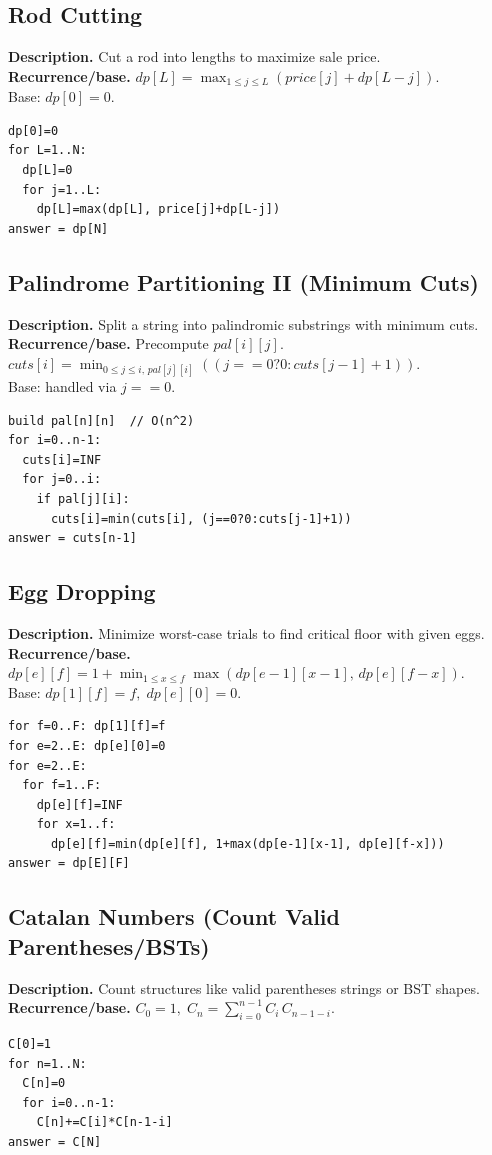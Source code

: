 \documentclass[9pt]{extarticle}
\begin{document}
\subsection{Rod Cutting}
\textbf{Description.} Cut a rod into lengths to maximize sale price.\\
\textbf{Recurrence/base.} \(dp[L]=\max_{1\le j\le L}(price[j]+dp[L-j])\).\\  
Base: \(dp[0]=0\).
\begin{verbatim}
dp[0]=0
for L=1..N:
  dp[L]=0
  for j=1..L:
    dp[L]=max(dp[L], price[j]+dp[L-j])
answer = dp[N]
\end{verbatim}

\subsection{Palindrome Partitioning II (Minimum Cuts)}
\textbf{Description.} Split a string into palindromic substrings with minimum cuts.\\
\textbf{Recurrence/base.} Precompute \(pal[i][j]\).  \\
\(cuts[i]=\min_{0\le j\le i,\,pal[j][i]}( (j==0?0:cuts[j-1]+1) )\).  \\
Base: handled via \(j==0\).
\begin{verbatim}
build pal[n][n]  // O(n^2)
for i=0..n-1:
  cuts[i]=INF
  for j=0..i:
    if pal[j][i]:
      cuts[i]=min(cuts[i], (j==0?0:cuts[j-1]+1))
answer = cuts[n-1]
\end{verbatim}

\subsection{Egg Dropping}
\textbf{Description.} Minimize worst-case trials to find critical floor with given eggs.\\
\textbf{Recurrence/base.} \(dp[e][f]=1+\min_{1\le x\le f}\max(dp[e-1][x-1],\,dp[e][f-x])\).\\  
Base: \(dp[1][f]=f,\;dp[e][0]=0\).
\begin{verbatim}
for f=0..F: dp[1][f]=f
for e=2..E: dp[e][0]=0
for e=2..E:
  for f=1..F:
    dp[e][f]=INF
    for x=1..f:
      dp[e][f]=min(dp[e][f], 1+max(dp[e-1][x-1], dp[e][f-x]))
answer = dp[E][F]
\end{verbatim}

\subsection{Catalan Numbers (Count Valid Parentheses/BSTs)}
\textbf{Description.} Count structures like valid parentheses strings or BST shapes.\\
\textbf{Recurrence/base.} \(C_0=1,\; C_n=\sum_{i=0}^{n-1} C_i\,C_{n-1-i}\).\\
\begin{verbatim}
C[0]=1
for n=1..N:
  C[n]=0
  for i=0..n-1:
    C[n]+=C[i]*C[n-1-i]
answer = C[N]
\end{verbatim}
\end{document}
